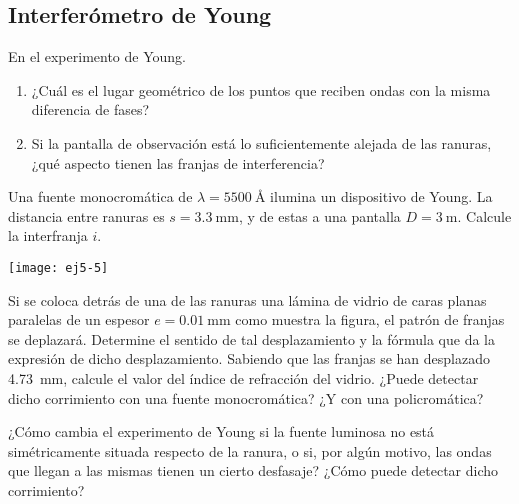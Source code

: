\subsection*{Interferómetro de Young}

\item En el experimento de Young.
\begin{enumerate}
	\item ¿Cuál es el lugar geométrico de los puntos que reciben ondas con la misma diferencia de fases?
	\item Si la pantalla de observación está lo suficientemente alejada de las ranuras, ¿qué aspecto tienen las franjas de interferencia?
\end{enumerate}


\item 
\begin{minipage}[t][2.4cm]{0.6\textwidth}
Una fuente monocromática de $\lambda = \SI{5500}{\angstrom}$ ilumina un dispositivo de Young.
La distancia entre ranuras es $s = \SI{3.3}{\milli\metre}$, y de estas a una pantalla $D = \SI{3}{\metre}$.
Calcule la interfranja $i$.
\end{minipage}
\begin{minipage}[c][4cm][t]{0.35\textwidth}
	\texttt{[image: ej5-5]}
\end{minipage}
Si se coloca detrás de una de las ranuras una lámina de vidrio de caras planas paralelas de un espesor $e = \SI{0.01}{\milli\metre}$ como muestra la figura, el patrón de franjas se deplazará.
Determine el sentido de tal desplazamiento y la fórmula que da la expresión de dicho desplazamiento.
Sabiendo que las franjas se han desplazado \SI{4.73}{\milli\metre}, calcule el valor del índice de refracción del vidrio.
¿Puede detectar dicho corrimiento con una fuente monocromática?
¿Y con una policromática?


\item ¿Cómo cambia el experimento de Young si la fuente luminosa no está simétricamente situada respecto de la ranura, o si, por algún motivo, las ondas que llegan a las mismas tienen un cierto desfasaje?
¿Cómo puede detectar dicho corrimiento?




